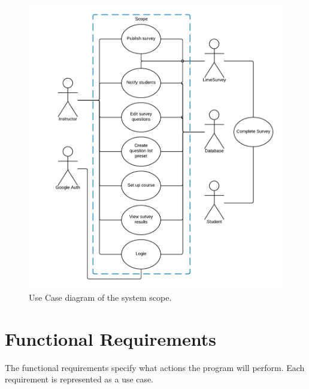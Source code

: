 \documentclass{article}
\begin{document}
\begin{center}
\begin{figure}
    \centering
    \includegraphics[scale=.75]{Scope.png}
    \caption{Use Case diagram of the system scope.}
    \label{fig:my_label}
\end{figure}
\end{center}

\section{Functional Requirements}

The functional requirements specify what actions the program will perform. Each requirement is represented as a use case.
\end{document}
